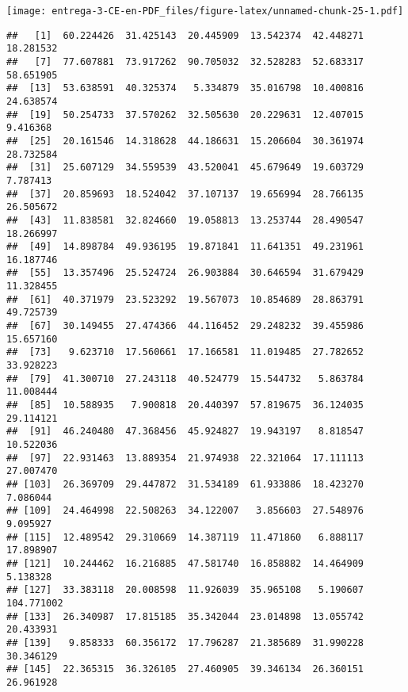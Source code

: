 \documentclass[
]{article}
\newenvironment{Shaded}{\begin{snugshade}}{\end{snugshade}}
\newcommand{\DataTypeTok}[1]{\textcolor[rgb]{0.13,0.29,0.53}{#1}}
\newcommand{\DecValTok}[1]{\textcolor[rgb]{0.00,0.00,0.81}{#1}}
\newcommand{\KeywordTok}[1]{\textcolor[rgb]{0.13,0.29,0.53}{\textbf{#1}}}
\newcommand{\NormalTok}[1]{#1}
\newcommand{\OperatorTok}[1]{\textcolor[rgb]{0.81,0.36,0.00}{\textbf{#1}}}
\newcommand{\StringTok}[1]{\textcolor[rgb]{0.31,0.60,0.02}{#1}}
\begin{document}
\texttt{[image: entrega-3-CE-en-PDF\_files/figure-latex/unnamed-chunk-25-1.pdf]}

\begin{Shaded}
\end{Shaded}

\begin{verbatim}
##   [1]  60.224426  31.425143  20.445909  13.542374  42.448271  18.281532
##   [7]  77.607881  73.917262  90.705032  32.528283  52.683317  58.651905
##  [13]  53.638591  40.325374   5.334879  35.016798  10.400816  24.638574
##  [19]  50.254733  37.570262  32.505630  20.229631  12.407015   9.416368
##  [25]  20.161546  14.318628  44.186631  15.206604  30.361974  28.732584
##  [31]  25.607129  34.559539  43.520041  45.679649  19.603729   7.787413
##  [37]  20.859693  18.524042  37.107137  19.656994  28.766135  26.505672
##  [43]  11.838581  32.824660  19.058813  13.253744  28.490547  18.266997
##  [49]  14.898784  49.936195  19.871841  11.641351  49.231961  16.187746
##  [55]  13.357496  25.524724  26.903884  30.646594  31.679429  11.328455
##  [61]  40.371979  23.523292  19.567073  10.854689  28.863791  49.725739
##  [67]  30.149455  27.474366  44.116452  29.248232  39.455986  15.657160
##  [73]   9.623710  17.560661  17.166581  11.019485  27.782652  33.928223
##  [79]  41.300710  27.243118  40.524779  15.544732   5.863784  11.008444
##  [85]  10.588935   7.900818  20.440397  57.819675  36.124035  29.114121
##  [91]  46.240480  47.368456  45.924827  19.943197   8.818547  10.522036
##  [97]  22.931463  13.889354  21.974938  22.321064  17.111113  27.007470
## [103]  26.369709  29.447872  31.534189  61.933886  18.423270   7.086044
## [109]  24.464998  22.508263  34.122007   3.856603  27.548976   9.095927
## [115]  12.489542  29.310669  14.387119  11.471860   6.888117  17.898907
## [121]  10.244462  16.216885  47.581740  16.858882  14.464909   5.138328
## [127]  33.383118  20.008598  11.926039  35.965108   5.190607 104.771002
## [133]  26.340987  17.815185  35.342044  23.014898  13.055742  20.433931
## [139]   9.858333  60.356172  17.796287  21.385689  31.990228  30.346129
## [145]  22.365315  36.326105  27.460905  39.346134  26.360151  26.961928

\end{verbatim}
\end{document}
